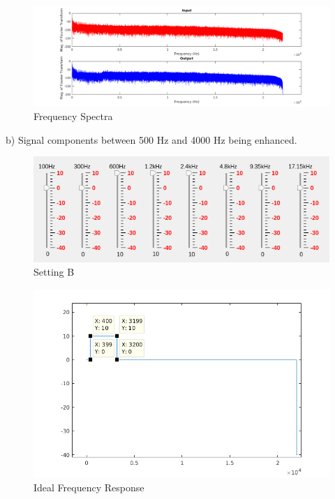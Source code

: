 \documentclass[titlepage]{article}
\begin{document}
\begin{figure}[htbp]
\centering
\includegraphics[width=.9\linewidth]{fs_a.png}
\caption{Frequency Spectra}
\end{figure}

\newpage  
  b) Signal components between 500 Hz and 4000 Hz being enhanced.

\begin{figure}[htbp]
\centering
\includegraphics[width=.9\linewidth]{setting_b.png}
\caption{Setting B}
\end{figure}

\begin{figure}[htbp]
\centering
\includegraphics[width=.9\linewidth]{ideal_fr_b.png}
\caption{Ideal Frequency Response}
\end{figure}
\end{document}
